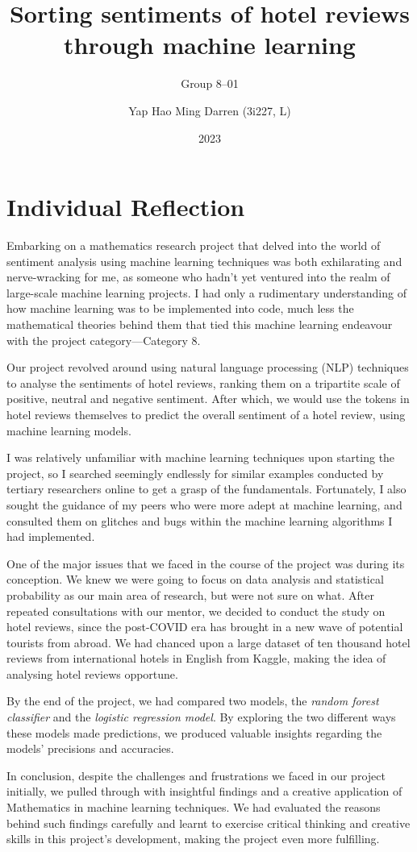 \documentclass[12pt,a4paper,bibliography=totocnumbered]{scrartcl}
\title{Sorting sentiments of hotel reviews through machine learning}
\subtitle{Group 8--01}
\author{Yap Hao Ming Darren (3i227, L)}
\date{2023}
\def\it#1{\textit{#1}}
\begin{document}
\doublespacing
\maketitle
\tableofcontents
\section{Individual Reflection}
Embarking on a mathematics research project
that delved into the world of sentiment analysis
using machine learning techniques was both exhilarating
and nerve-wracking for me, as someone who hadn't yet ventured
into the realm of large-scale machine learning projects.
I had only a rudimentary understanding of how machine
learning was to be implemented into code, much less
the mathematical theories behind them that tied
this machine learning endeavour with the project category---Category 8.

Our project revolved around using natural language processing
(NLP) techniques to analyse the sentiments of hotel reviews,
ranking them on a tripartite scale of positive, neutral
and negative sentiment. After which, we would use
the tokens in hotel reviews themselves to predict
the overall sentiment of a hotel review, using machine learning
models.

I was relatively unfamiliar with machine learning
techniques upon starting the project, so I searched
seemingly endlessly for similar examples conducted
by tertiary researchers online to get a grasp
of the fundamentals. Fortunately, I also sought
the guidance of my peers who were more adept at
machine learning, and consulted them
on glitches and bugs within
the machine learning algorithms I had implemented.

One of the major issues that we faced in the course
of the project was during its conception. We knew
we were going to focus on data analysis and
statistical probability as our main area of research,
but were not sure on what. After repeated
consultations with our mentor, we decided to conduct
the study on hotel reviews, since the post-COVID
era has brought in a new wave of potential tourists
from abroad. We had chanced upon a large
dataset of ten thousand hotel reviews
from international hotels in English from Kaggle,
making the idea of analysing hotel reviews opportune.

By the end of the project, we had compared two models, the
\it{random forest classifier} and the \it{logistic regression model}.
By exploring the two different ways these models made predictions,
we produced valuable insights regarding the models' precisions
and accuracies.

In conclusion, despite the challenges and frustrations
we faced in our project initially, we pulled through
with insightful findings and a creative application
of Mathematics in machine learning techniques. We
had evaluated the reasons behind such findings carefully
and learnt to exercise critical thinking and creative
skills in this project's development, making
the project even more fulfilling.
\end{document}
